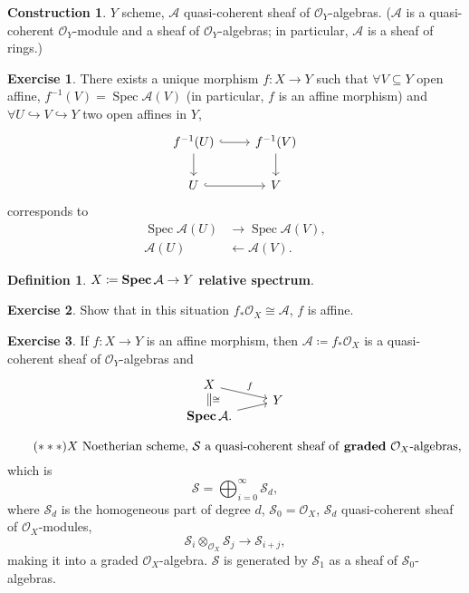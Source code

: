 \documentclass[12pt]{article}
\DeclareMathOperator{\Spec}{Spec}
\DeclareMathOperator{\relSpec}{\textnormal{\textbf{Spec}}}
\theoremstyle{definition}
\newtheorem*{definition}{Definition}
\newtheorem*{exercise}{Exercise}
\newtheorem*{construction}{Construction}
\begin{document}
\begin{construction}
$Y$ scheme, $\mathcal A$ quasi-coherent sheaf of $\mathcal O_Y$-algebras. ($\mathcal A$ is a quasi-coherent $\mathcal O_Y$-module and a sheaf of $\mathcal O_Y$-algebras; in particular, $\mathcal A$ is a sheaf of rings.)

\begin{exercise}
There exists a unique morphism $f:X\rightarrow Y$ such that $\forall V\subseteq Y$ open affine, $f^{-1}(V)=\Spec\mathcal A(V)$ (in particular, $f$ is an affine morphism) and $\forall U\hookrightarrow V\hookrightarrow Y$ two open affines in $Y$,
\[\begin{tikzcd}f^{-1}(U)\arrow[r,hook]\arrow[d]&f^{-1}(V)\arrow[d]\\U\arrow[r,hook]&V\end{tikzcd}\]
corresponds to
\begin{align*}
\Spec\mathcal A(U)&\longrightarrow\Spec\mathcal A(V),\\\mathcal A(U)&\longleftarrow\mathcal A(V).
\end{align*}
\end{exercise}

\begin{definition}
$X\coloneqq\relSpec\mathcal A\rightarrow Y$ \textbf{relative spectrum}.
\end{definition}

\begin{exercise}
Show that in this situation $f_*\mathcal O_X\cong\mathcal A$, $f$ is affine.
\end{exercise}

\begin{exercise}
If $f:X\rightarrow Y$ is an affine morphism, then $\mathcal A\coloneqq f_*\mathcal O_X$ is a quasi-coherent sheaf of $\mathcal O_Y$-algebras and
\[\begin{tikzcd}X\arrow[rd,"f"]\arrow[dd,-,double equal sign distance,double,"\cong"]\\[-0.7cm]&Y\\[-0.7cm]\relSpec\mathcal A.\arrow[ru]\end{tikzcd}\]
\end{exercise}
\end{construction}

\begin{equation}\tag{$***$}\label{condition_algebra}
X\text{ Noetherian scheme, }\mathcal S\text{ a quasi-coherent sheaf of \textbf{graded} }\mathcal O_X\text{-algebras},
\end{equation}
which is
\[\mathcal S=\bigoplus_{i=0}^\infty\mathcal S_d,\]
where $\mathcal S_d$ is the homogeneous part of degree $d$, $\mathcal S_0=\mathcal O_X$, $\mathcal S_d$ quasi-coherent sheaf of $\mathcal O_X$-modules,
\[\mathcal S_i\otimes_{\mathcal O_X}\mathcal S_j\longrightarrow\mathcal S_{i+j},\]
making it into a graded $\mathcal O_X$-algebra. $\mathcal S$ is generated by $\mathcal S_1$ as a sheaf of $\mathcal S_0$-algebras.
\end{document}
